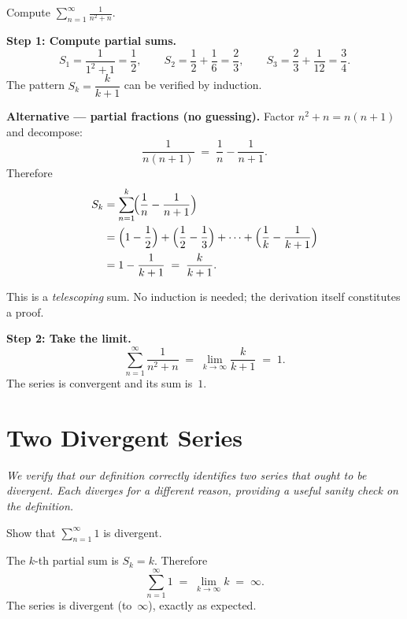 \begin{example}
\label{ex:13-4}
Compute $\displaystyle\sum_{n=1}^{\infty}\frac{1}{n^{2}+n}$.

\textbf{Step 1: Compute partial sums.}
\[
  S_{1} = \frac{1}{1^{2}+1} = \frac{1}{2}, \qquad
  S_{2} = \frac{1}{2}+\frac{1}{6} = \frac{2}{3}, \qquad
  S_{3} = \frac{2}{3}+\frac{1}{12} = \frac{3}{4}.
\]
The pattern $S_{k} = \dfrac{k}{k+1}$ can be verified by induction.

\textbf{Alternative --- partial fractions (no guessing).}  Factor $n^{2}+n = n(n+1)$ and decompose:
\[
  \frac{1}{n(n+1)} \;=\; \frac{1}{n} - \frac{1}{n+1}.
\]
Therefore
\begin{align*}
  S_{k} &= \sum_{n=1}^{k}\!\Bigl(\frac{1}{n}-\frac{1}{n+1}\Bigr) \\
  &= \Bigl(1-\frac{1}{2}\Bigr)+\Bigl(\frac{1}{2}-\frac{1}{3}\Bigr)+\cdots+\Bigl(\frac{1}{k}-\frac{1}{k+1}\Bigr) \\
  &= 1 - \frac{1}{k+1} \;=\; \frac{k}{k+1}.
\end{align*}

This is a \emph{telescoping} sum.  No induction is needed; the derivation itself constitutes a proof.

\textbf{Step 2: Take the limit.}
\[
  \sum_{n=1}^{\infty}\frac{1}{n^{2}+n}
  \;=\; \lim_{k\to\infty}\frac{k}{k+1} \;=\; 1.
\]
The series is convergent and its sum is~$1$.
\end{example}

\section{Two Divergent Series}
\label{sec:13.4}

\textit{We verify that our definition correctly identifies two series that ought to be divergent.  Each diverges for a different reason, providing a useful sanity check on the definition.}

\begin{example}
\label{ex:13-5}
Show that $\displaystyle\sum_{n=1}^{\infty}1$ is divergent.

The $k$-th partial sum is $S_{k}=k$.  Therefore
\[
  \sum_{n=1}^{\infty}1 \;=\; \lim_{k\to\infty} k \;=\; \infty.
\]
The series is divergent (to~$\infty$), exactly as expected.
\end{example}


